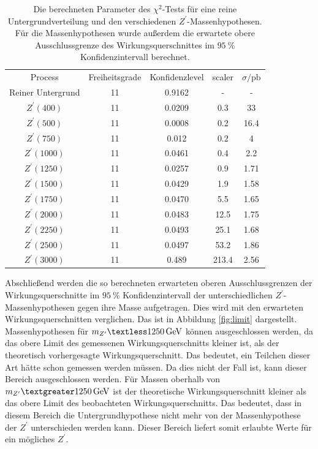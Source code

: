 \begin{table}
  \centering
  \caption{Die berechneten Parameter des $\chi^2$-Tests für eine reine Untergrundverteilung und den verschiedenen $Z^\prime$-Massenhypothesen. Für die Massenhypothesen wurde außerdem die erwartete obere Ausschlussgrenze des Wirkungsquerschnittes im $\SI{95}{\percent}$ Konfidenzintervall berechnet.}
  \label{tab:chi2}
  \begin{tabular}{c|cccc}
    \toprule
    Process & Freiheitsgrade & Konfidenzlevel & scaler & $\sigma / \si{\pico\barn}$ \\
    Reiner Untergrund & 11 & 0.9162 & - & - \\
    $Z^\prime (400)$  & 11 & 0.0209 & 0.3 & 33 \\
    $Z^\prime (500)$  & 11 & 0.0008 & 0.2 & 16.4 \\
    $Z^\prime (750)$  & 11 & 0.012  & 0.2 & 4 \\
    $Z^\prime (1000)$ & 11 & 0.0461 & 0.4 & 2.2 \\
    $Z^\prime (1250)$ & 11 & 0.0257 & 0.9 & 1.71 \\
    $Z^\prime (1500)$ & 11 & 0.0429 & 1.9 & 1.58 \\
    $Z^\prime (1750)$ & 11 & 0.0470 & 5.5 & 1.65 \\
    $Z^\prime (2000)$ & 11 & 0.0483 & 12.5 & 1.75 \\
    $Z^\prime (2250)$ & 11 & 0.0493 & 25.1 & 1.68 \\
    $Z^\prime (2500)$ & 11 & 0.0497 & 53.2 & 1.86 \\
    $Z^\prime (3000)$ & 11 & 0.489  & 213.4 & 2.56 \\
    \midrule
    \bottomrule
  \end{tabular}
\end{table}

Abschließend werden die so berechneten erwarteten oberen Ausschlussgrenzen der Wirkungsquerschnitte im $\SI{95}{\percent}$ Konfidenzintervall der unterschiedlichen $Z^\prime$-Massenhypothesen gegen ihre Masse aufgetragen.
Dies wird mit den erwarteten Wirkungsquerschnitten verglichen.
Das ist in Abbildung \ref{fig:limit} dargestellt.
Massenhypothesen für $m_{Z^\prime} \textless \SI{1250}{\giga\electronvolt}$ können 
ausgeschlossen werden, da das obere Limit des gemessenen Wirkungsquerschnitts 
kleiner ist, als der theoretisch vorhergesagte Wirkungsquerschnitt. Das bedeutet, 
ein Teilchen dieser Art hätte schon gemessen werden müssen. Da dies nicht der Fall 
ist, kann dieser Bereich ausgeschlossen werden. Für Massen oberhalb von 
$m_{Z^\prime} \textgreater \SI{1250}{\giga\electronvolt}$ ist der theoretische 
Wirkungsquerschnitt kleiner als das obere Limit des beobachteten Wirkungsquerschnitts. 
Das bedeutet, dass in diesem Bereich die Untergrundhypothese nicht mehr von 
der Massenhypothese der $Z^\prime$ unterschieden werden kann. Dieser Bereich liefert somit 
erlaubte Werte für ein mögliches $Z^\prime$.


